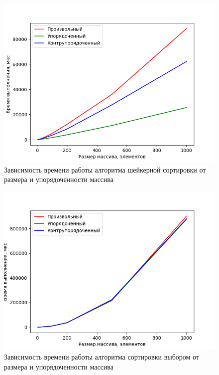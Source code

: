 \documentclass[12pt]{report}
\begin{document}
    \begin{figure}[H]
        \centering
        \includegraphics[width=1\linewidth]{img/shaker_graph}
        \caption{Зависимость времени работы алгоритма шейкерной сортировки от размера и упорядоченности массива}
        \label{fig:shaker_gr}
    \end{figure}
    \begin{figure}[H]
        \centering
        \includegraphics[width=1\linewidth]{img/selection_graph}
        \caption{Зависимость времени работы алгоритма сортировки выбором от размера и упорядоченности массива}
        \label{fig:selection_gr}
    \end{figure}
\end{document}
